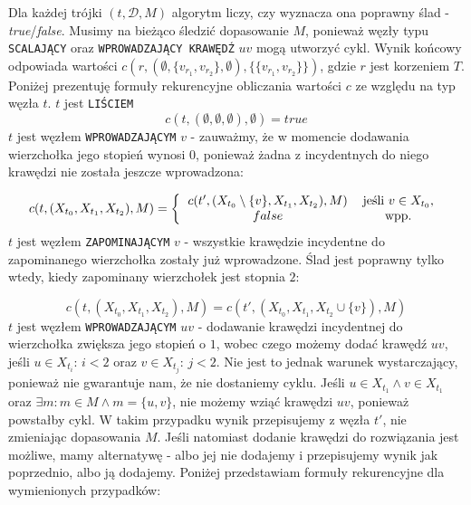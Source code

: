 \documentclass[12pt, oneside]{report}
\begin{document}
Dla każdej trójki $(t, \mathcal{D}, M)$ algorytm liczy, czy wyznacza ona poprawny ślad - \emph{true}/\emph{false}. Musimy na bieżąco śledzić dopasowanie $M$, ponieważ węzły typu \texttt{SCALAJĄCY} oraz \texttt{WPROWADZAJĄCY KRAWĘDŹ} $uv$ mogą utworzyć cykl. Wynik końcowy odpowiada wartości $c(r, (\emptyset, \{v_{r_1}, v_{r_2}\}, \emptyset), \{\{v_{r_1}, v_{r_2}\}\})$, gdzie $r$ jest korzeniem $T$. Poniżej prezentuję formuły rekurencyjne obliczania wartości $c$ ze względu na typ węzła $t$.
\newline\newline
$t$ jest \texttt{LIŚCIEM}
$$c(t, (\emptyset, \emptyset, \emptyset), \emptyset) = true$$
\newline
$t$ jest węzłem \texttt{WPROWADZAJĄCYM} $v$ - zauważmy, że w momencie dodawania wierzchołka jego stopień wynosi $0$, ponieważ żadna z incydentnych do niego krawędzi nie została jeszcze wprowadzona:

\[
c(t, (X_{t_0}, X_{t_1}, X_{t_2}), M) =  
\left \{
  \begin{tabular}{ccc}
  $c(t', (X_{t_0} \setminus \{v\}, X_{t_1}, X_{t_2}), M)$ & jeśli $v \in X_{t_0}$,\\
  $false$ & wpp.
  \end{tabular}
\right. 
\]
\newline
$t$ jest węzłem \texttt{ZAPOMINAJĄCYM} $v$ - wszystkie krawędzie incydentne do zapominanego wierzchołka zostały już wprowadzone. Ślad jest poprawny tylko wtedy, kiedy zapominany wierzchołek jest stopnia $2$:

$$c(t, (X_{t_0}, X_{t_1}, X_{t_2}), M) = c(t', (X_{t_0}, X_{t_1}, X_{t_2} \cup \{v\}), M)$$
\newline
$t$ jest węzłem \texttt{WPROWADZAJĄCYM} $uv$ - dodawanie krawędzi incydentnej do wierzchołka zwiększa jego stopień o $1$, wobec czego możemy dodać krawędź $uv$, jeśli $u \in X_{t_i}$: $i<2$ oraz $v \in X_{t_j}$: $j<2$. Nie jest to jednak warunek wystarczający, ponieważ nie gwarantuje nam, że nie dostaniemy cyklu. Jeśli $u \in X_{t_1} \wedge v \in X_{t_1}$ oraz $\exists m : m \in M \wedge m = \{u,v\}$, nie możemy wziąć krawędzi $uv$, ponieważ powstałby cykl. W takim przypadku wynik przepisujemy z węzła $t'$, nie zmieniając dopasowania $M$. Jeśli natomiast dodanie krawędzi do rozwiązania jest możliwe, mamy alternatywę - albo jej nie dodajemy i przepisujemy wynik jak poprzednio, albo ją dodajemy. Poniżej przedstawiam formuły rekurencyjne dla wymienionych przypadków:
\end{document}
